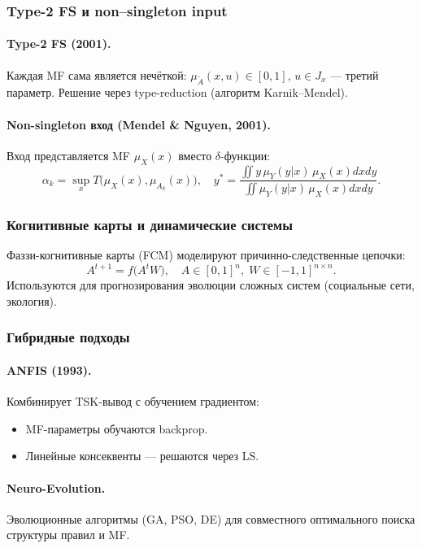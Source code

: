 \subsubsection{Type-2 FS и non–singleton input}
\label{subsubsec:type2_nsi_expand}

\paragraph{Type-2 FS (2001).}  
Каждая MF сама является нечёткой: $\mu_{\tilde A}(x,u)\in[0,1]$, $u\in J_x$ — третий параметр. Решение через type-reduction (алгоритм Karnik–Mendel).

\paragraph{Non-singleton вход (Mendel \& Nguyen, 2001).}  
Вход представляется MF $\mu_X(x)$ вместо $\delta$-функции:
\[
  \alpha_k=\sup_xT\bigl(\mu_X(x),\mu_{A_k}(x)\bigr),\quad
  y^*=\frac{\iint y\,\mu_Y(y|x)\,\mu_X(x)dxdy}{\iint\mu_Y(y|x)\,\mu_X(x)dxdy}.
\]

\subsubsection{Когнитивные карты и динамические системы}
\label{subsubsec:cognitive_maps_expand}

Фаззи-когнитивные карты (FCM) моделируют причинно-следственные цепочки:
\[
  A^{t+1}=f\bigl(A^tW\bigr),\quad A\in[0,1]^n,\;W\in[-1,1]^{n\times n}.
\]
Используются для прогнозирования эволюции сложных систем (социальные сети, экология).

\subsubsection{Гибридные подходы}
\label{subsubsec:hybrids_expand}

\paragraph{ANFIS (1993).}  
Комбинирует TSK-вывод с обучением градиентом:
\begin{itemize}
  \item MF-параметры обучаются backprop.
  \item Линейные консеквенты — решаются через LS.
\end{itemize}

\paragraph{Neuro-Evolution.}  
Эволюционные алгоритмы (GA, PSO, DE) для совместного оптимального поиска структуры правил и MF.

